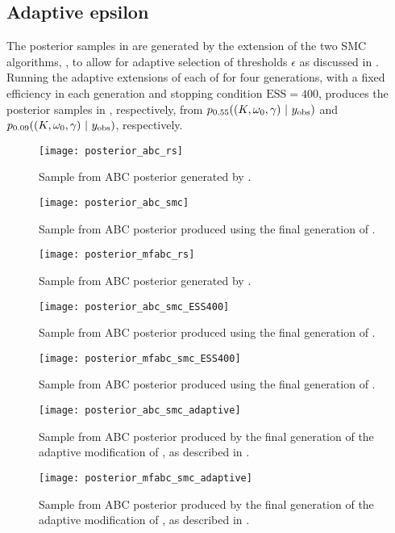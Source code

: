 \documentclass[supplement,review]{siamonline190516}
\begin{document}
\subsection{Adaptive epsilon}
The posterior samples in  are generated by the extension of the two SMC algorithms, , to allow for adaptive selection of thresholds $\epsilon$ as discussed in .
Running the adaptive extensions of each of  for four generations, with a fixed efficiency in each generation and stopping condition $\mathrm{ESS}=400$, produces the posterior samples in , respectively, from $p_{0.55}((K, \omega_0, \gamma)~|~y_{\mathrm{obs}})$ and $p_{0.09}((K, \omega_0, \gamma)~|~y_{\mathrm{obs}})$, respectively.

\begin{figure*}[p]
\centering
\texttt{[image: posterior\_abc\_rs]}
\caption{
Sample from ABC posterior generated by .
}
\label{post:ABC:Rejection}
\end{figure*}

\begin{figure*}[p]
\centering
\texttt{[image: posterior\_abc\_smc]}
\caption{
Sample from ABC posterior produced using the final generation of .
}
\label{post:ABC:SMC}
\end{figure*}

\begin{figure*}[p]
\centering
\texttt{[image: posterior\_mfabc\_rs]}
\caption{
Sample from ABC posterior generated by .
}
\label{post:MFABC:Rejection}
\end{figure*}

\begin{figure*}[p]
\centering
\texttt{[image: posterior\_abc\_smc\_ESS400]}
\caption{
Sample from ABC posterior produced using the final generation of .
}
\label{post:ABC:SMC:ESS400}
\end{figure*}

\begin{figure*}[p]
\centering
\texttt{[image: posterior\_mfabc\_smc\_ESS400]}
\caption{
Sample from ABC posterior produced using the final generation of .
}
\label{post:MFABC:SMC:ESS400}
\end{figure*}


\begin{figure*}[p]
\centering
\texttt{[image: posterior\_abc\_smc\_adaptive]}
\caption{
Sample from ABC posterior produced by the final generation of the adaptive modification of , as described in .
}
\label{post:ABC:SMC:adaptive}
\end{figure*}

\begin{figure*}[p]
\centering
\texttt{[image: posterior\_mfabc\_smc\_adaptive]}
\caption{
Sample from ABC posterior produced by the final generation of the adaptive modification of , as described in .
}
\label{post:MFABC:SMC:adaptive}
\end{figure*}
\end{document}
